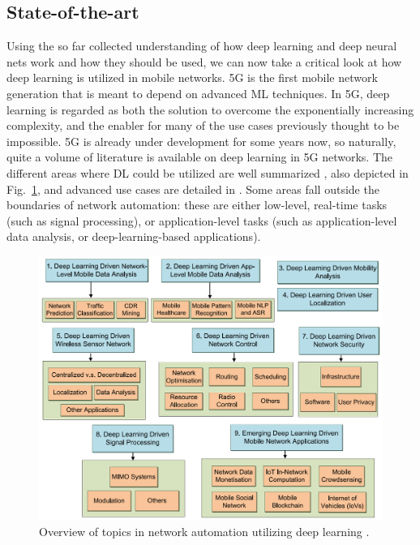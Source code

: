 		
	
		\subsection{State-of-the-art}
			\label{cha:deep_learning:sec:related_work}
			
			Using the so far collected understanding of how deep learning and deep neural nets work and how they should be used, we can now take a critical look at how deep learning is utilized in mobile networks.
			\ac{5G} is the first mobile network generation that is meant to depend on advanced \ac{ML} techniques.
			In \ac{5G},	deep learning is regarded as both the solution to overcome the exponentially increasing complexity, and the enabler for many of the use cases previously thought to be impossible.
			\ac{5G} is already under development for some years now, so naturally, quite a volume of literature is available on deep learning in \ac{5G} networks.
			The different areas where \ac{DL} could be utilized are well summarized \cite{dl_mobile_survey}, also depicted in Fig.~\ref{fig:dl_mobile_uses}, and advanced use cases are detailed in \cite{can_book}.
			Some areas fall outside the boundaries of network automation: these are either low-level, real-time tasks (such as signal processing), or application-level tasks (such as application-level data analysis, or deep-learning-based applications).
			
			\begin{figure}[ht]
				\centering
				\includegraphics[width=\linewidth]{figures/02_deep_learning/dl_mobile_uses/dl_mobile_uses.png}
				\caption[DL topics in network automation]{Overview of topics in network automation utilizing deep learning \cite{dl_mobile_survey}.}
				\label{fig:dl_mobile_uses}
			\end{figure}
			
